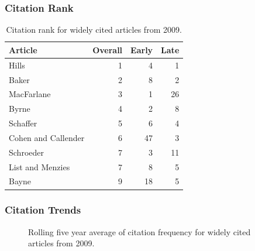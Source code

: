 \documentclass[
  10pt,
  letterpaper,
  DIV=11,
  numbers=noendperiod,
  twoside]{scrartcl}
\begin{document}
\subsubsection*{Citation Rank}\label{sec-rank-2009}

\begin{longtable}[]{@{}lrrr@{}}

\caption{\label{tbl-citation-rank-2009}Citation rank for widely cited
articles from 2009.}

\tabularnewline

\toprule\noalign{}
Article & Overall & Early & Late \\
\midrule\noalign{}
\endhead
\bottomrule\noalign{}
\endlastfoot
Hills & 1 & 4 & 1 \\
Baker & 2 & 8 & 2 \\
MacFarlane & 3 & 1 & 26 \\
Byrne & 4 & 2 & 8 \\
Schaffer & 5 & 6 & 4 \\
Cohen and Callender & 6 & 47 & 3 \\
Schroeder & 7 & 3 & 11 \\
List and Menzies & 7 & 8 & 5 \\
Bayne & 9 & 18 & 5 \\

\end{longtable}

\subsubsection*{Citation Trends}\label{sec-trends-2009}

\begin{figure}


\caption{\label{fig-citation-spaghetti-2009}Rolling five year average of
citation frequency for widely cited articles from 2009.}

\end{figure}%
\end{document}
